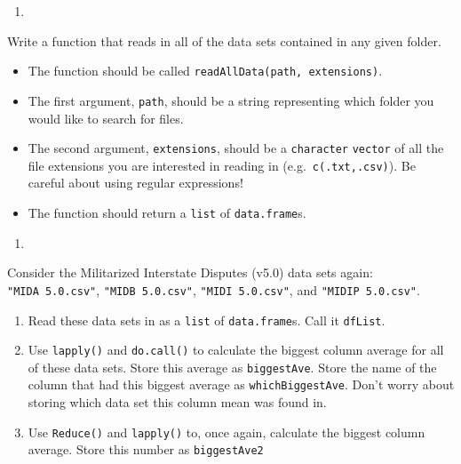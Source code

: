 \documentclass[12pt,krantz2]{krantz}
\providecommand{\tightlist}{%
  \setlength{\itemsep}{0pt}\setlength{\parskip}{0pt}}
\begin{document}
\begin{enumerate}
\def\labelenumi{\arabic{enumi}.}
\setcounter{enumi}{1}
\item
\end{enumerate}

Write a function that reads in all of the data sets contained in any given folder.

\begin{itemize}
\tightlist
\item
  The function should be called \texttt{readAllData(path,\ extensions)}.
\item
  The first argument, \texttt{path}, should be a string representing which folder you would like to search for files.
\item
  The second argument, \texttt{extensions}, should be a \texttt{character} \texttt{vector} of all the file extensions you are interested in reading in (e.g.~\texttt{c(\textquotesingle{}.txt\textquotesingle{},\textquotesingle{}.csv\textquotesingle{})}). Be careful about using regular expressions!
\item
  The function should return a \texttt{list} of \texttt{data.frame}s.
\end{itemize}

\begin{enumerate}
\def\labelenumi{\arabic{enumi}.}
\setcounter{enumi}{2}
\item
\end{enumerate}

Consider the Militarized Interstate Disputes (v5.0) \citep{mid5} data sets again: \texttt{"MIDA\ 5.0.csv"}, \texttt{"MIDB\ 5.0.csv"}, \texttt{"MIDI\ 5.0.csv"}, and \texttt{"MIDIP\ 5.0.csv"}.

\begin{enumerate}
\def\labelenumi{\alph{enumi})}
\tightlist
\item
  Read these data sets in as a \texttt{list} of \texttt{data.frame}s. Call it \texttt{dfList}.
\item
  Use \texttt{lapply()} and \texttt{do.call()} to calculate the biggest column average for all of these data sets. Store this average as \texttt{biggestAve}. Store the name of the column that had this biggest average as \texttt{whichBiggestAve}. Don't worry about storing which data set this column mean was found in.
\item
  Use \texttt{Reduce()} and \texttt{lapply()} to, once again, calculate the biggest column average. Store this number as \texttt{biggestAve2}
\end{enumerate}



\backmatter
\printindex
\end{document}
